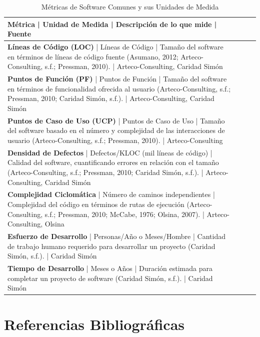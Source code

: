 \documentclass[11pt]{article}
\begin{document}
\begin{table}[h!]
\centering
\caption{Métricas de Software Comunes y sus Unidades de Medida}
\begin{tabular}{|l|l|l|l|}
\hline
Métrica | Unidad de Medida | Descripción de lo que mide | Fuente \\
\hline
\textbf{Líneas de Código (LOC)} | Líneas de Código | Tamaño del software en términos de líneas de código fuente (Asumano, 2012; Arteco-Consulting, s.f.; Pressman, 2010). | Arteco-Consulting, Caridad Simón \\
\hline
\textbf{Puntos de Función (PF)} | Puntos de Función | Tamaño del software en términos de funcionalidad ofrecida al usuario (Arteco-Consulting, s.f.; Pressman, 2010; Caridad Simón, s.f.). | Arteco-Consulting, Caridad Simón \\
\hline
\textbf{Puntos de Caso de Uso (UCP)} | Puntos de Caso de Uso | Tamaño del software basado en el número y complejidad de las interacciones de usuario (Arteco-Consulting, s.f.; Pressman, 2010). | Arteco-Consulting \\
\hline
\textbf{Densidad de Defectos} | Defectos/KLOC (mil líneas de código) | Calidad del software, cuantificando errores en relación con el tamaño (Arteco-Consulting, s.f.; Pressman, 2010; Caridad Simón, s.f.). | Arteco-Consulting, Caridad Simón \\
\hline
\textbf{Complejidad Ciclomática} | Número de caminos independientes | Complejidad del código en términos de rutas de ejecución (Arteco-Consulting, s.f.; Pressman, 2010; McCabe, 1976; Olsina, 2007). | Arteco-Consulting, Olsina \\
\hline
\textbf{Esfuerzo de Desarrollo} | Personas/Año o Meses/Hombre | Cantidad de trabajo humano requerido para desarrollar un proyecto (Caridad Simón, s.f.). | Caridad Simón \\
\hline
\textbf{Tiempo de Desarrollo} | Meses o Años | Duración estimada para completar un proyecto de software (Caridad Simón, s.f.). | Caridad Simón \\
\hline
\end{tabular}
\end{table}

\section{Referencias Bibliográficas}
\end{document}
